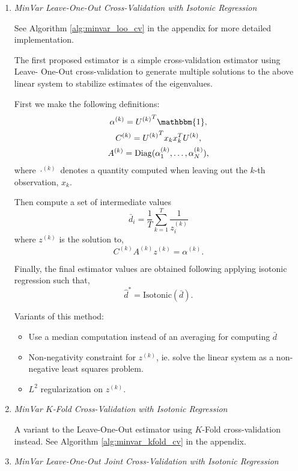 \documentclass{article}
\begin{document}
\begin{enumerate}

\item \emph{MinVar Leave-One-Out Cross-Validation with Isotonic Regression}

See Algorithm \ref{alg:minvar_loo_cv} in the appendix for more detailed implementation.

The first proposed estimator is a simple cross-validation estimator using Leave-
One-Out cross-validation to generate multiple solutions to the above linear
system to stabilize estimates of the eigenvalues.

First we make the following definitions:
\begin{gather*} 
	\alpha^{(k)} = {U^{(k)}}^T\mathbbm{1}, \\ 
	C^{(k)} = {U^{(k)}}^T x_k x_k^T U^{(k)}, \\
	A^{(k)} = \mathrm{Diag}(\alpha^{(k)}_1, \ldots, \alpha^{(k)}_N),
\end{gather*}
where $\cdot^{(k)}$ denotes a quantity computed when leaving out the $k$-th
observation, $x_k$.

Then compute a set of intermediate values 
$$
	\bar{d}_i = \frac1T \sum_{k=1}^T \frac{1}{z_i^{(k)}}
$$
where $z^{(k)}$ is the solution to,
$$
	C^{(k)} A^{(k)} z^{(k)} = \alpha^{(k)}.
$$

Finally, the final estimator values are obtained following applying isotonic
regression such that,
$$
	\hat{d}^* = \mathrm{Isotonic}(\bar{d}).
$$


Variants of this method:
\begin{itemize}
	\item Use a median computation instead of an averaging for computing $\bar{d}$
	
	\item Non-negativity constraint for $z^{(k)}$, ie. solve the linear system
	as a non-negative least squares problem.
	
	\item $L^2$ regularization on $z^{(k)}$.
\end{itemize}


\item \emph{MinVar $K$-Fold Cross-Validation with Isotonic Regression}

A variant to the Leave-One-Out estimator using $K$-Fold cross-validation
instead.  See Algorithm \ref{alg:minvar_kfold_cv} in the appendix.


\item \emph{MinVar Leave-One-Out Joint Cross-Validation with Isotonic Regression}


\end{enumerate}
\end{document}
